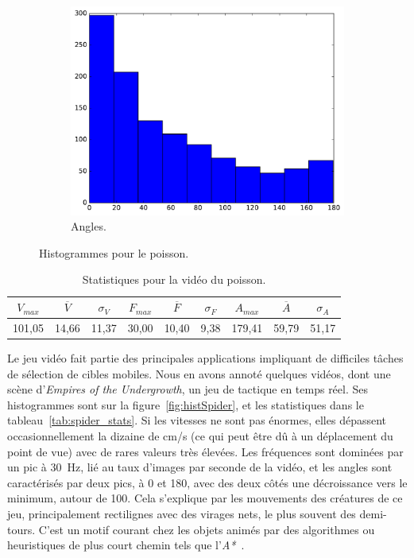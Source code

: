 \begin{figure}[!htbp]
\begin{subfigure}[t]{\subImgWclicks}
			\centering
			\includegraphics[width=\textwidth]{figures/ch3/poisson_angle}
			\caption{Angles.}
			\label{fig:poisson_angle}
		\end{subfigure}
		\caption[Histogrammes pour le poisson]{Histogrammes pour le poisson.}
		\label{fig:histPoisson}
	\end{figure}
	
\begin{table}
	\centering
	\begin{tabular}{c c c c c c c c c}
		$V_{max}$	& $\overline{V}$	& $\sigma_{V}$	& $F_{max}$	& $\overline{F}$	& $\sigma_{F}$	& $A_{max}$	& $\overline{A}$	& $\sigma_{A}$	\bigstrut[b] \\ \hline

		101,05		& 14,66				& 11,37			& 30,00		& 10,40				& 9,38			& 179,41	& 59,79				& 51,17			\bigstrut[t] \\
	\end{tabular}
	\caption[Statistiques pour la vidéo du poisson]{Statistiques pour la vidéo du poisson.}
	\label{tab:poisson_stats}
\end{table}
	
	Le jeu vidéo fait partie des principales applications impliquant de difficiles tâches de sélection de cibles mobiles. Nous en avons annoté quelques vidéos, dont une scène d'\emph{Empires of the Undergrowth}, un jeu de tactique en temps réel. Ses histogrammes sont sur la figure~\ref{fig:histSpider}, et les statistiques dans le tableau~\ref{tab:spider_stats}. Si les vitesses ne sont pas énormes, elles dépassent occasionnellement la dizaine de cm/s (ce qui peut être dû à un déplacement du point de vue) avec de rares valeurs très élevées. Les fréquences sont dominées par un pic à 30~Hz, lié au taux d'images par seconde de la vidéo, et les angles sont caractérisés par deux pics, à 0\textdegree{} et 180\textdegree{}, avec des deux côtés une décroissance vers le minimum, autour de 100\textdegree{}. Cela s'explique par les mouvements des créatures de ce jeu, principalement rectilignes avec des virages nets, le plus souvent des demi-tours. C'est un motif courant chez les objets animés par des algorithmes ou heuristiques de plus court chemin tels que l'\emph{A*}~\cite{dijkstra1959note, hart1968formal}.

